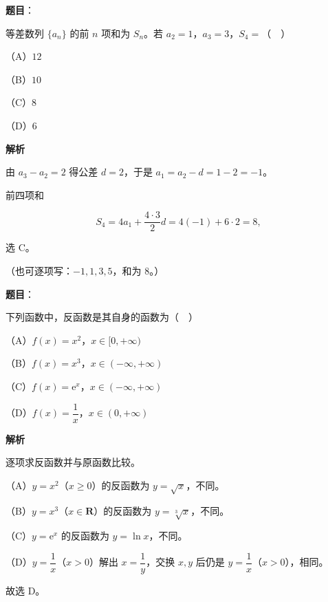 \begin{answer}

\textbf{题目}：

等差数列 $\{a_n\}$ 的前 $n$ 项和为 $S_n$。若 $a_2=1$，$a_3=3$，$S_4=$（　）

（A）$12$

（B）$10$

（C）$8$

（D）$6$

\textbf{解析}

由 $a_3-a_2=2$ 得公差 $d=2$，于是 $a_1=a_2-d=1-2=-1$。

前四项和

\nopagebreak[4]
\[S_4=4a_1+\frac{4\cdot3}{2}d=4(-1)+6\cdot2=8,\]

选 C。

（也可逐项写：$-1,1,3,5$，和为 $8$。）


\end{answer}
\begin{answer}

\textbf{题目}：

下列函数中，反函数是其自身的函数为（　）

（A）$f(x)=x^2$，$x\in[0,+\infty)$

（B）$f(x)=x^3$，$x\in(-\infty,+\infty)$

（C）$f(x)=\mathrm e^x$，$x\in(-\infty,+\infty)$

（D）$f(x)=\dfrac1x$，$x\in(0,+\infty)$

\textbf{解析}

逐项求反函数并与原函数比较。

（A）$y=x^2$（$x\geqslant0$）的反函数为 $y=\sqrt x$，不同。

（B）$y=x^3$（$x\in\mathbf R$）的反函数为 $y=\sqrt[3]x$，不同。

（C）$y=\mathrm e^x$ 的反函数为 $y=\ln x$，不同。

（D）$y=\dfrac1x$（$x>0$）解出 $x=\dfrac1y$，交换 $x,y$ 后仍是 $y=\dfrac1x$（$x>0$），相同。

故选 D。


\end{answer}
